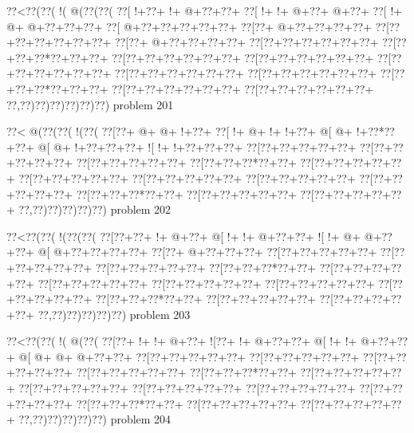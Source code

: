 \vbox{\vbox{\goo
\0??<\0??(\0??(\- !(\- @(\0??(\0??(
\0??[\- !+\0??+\- !+\- @+\0??+\0??+
\0??[\- !+\- !+\- @+\0??+\- @+\0??+
\0??[\- !+\- @+\- @+\0??+\0??+\0??+
\0??[\- @+\0??+\0??+\0??+\0??+\0??+
\0??[\0??+\- @+\0??+\0??+\0??+\0??+
\0??[\0??+\0??+\0??+\0??+\0??+\0??+
\0??[\0??+\- @+\0??+\0??+\0??+\0??+
\0??[\0??+\0??+\0??+\0??+\0??+\0??+
\0??[\0??+\0??+\0??*\0??+\0??+\0??+
\0??[\0??+\0??+\0??+\0??+\0??+\0??+
\0??[\0??+\0??+\0??+\0??+\0??+\0??+
\0??[\0??+\0??+\0??+\0??+\0??+\0??+
\0??[\0??+\0??+\0??+\0??+\0??+\0??+
\0??[\0??+\0??+\0??+\0??+\0??+\0??+
\0??[\0??+\0??+\0??*\0??+\0??+\0??+
\0??[\0??+\0??+\0??+\0??+\0??+\0??+
\0??[\0??+\0??+\0??+\0??+\0??+\0??+
\0??,\0??)\0??)\0??)\0??)\0??)\0??)
}
\hfil problem 201\hfil\break
}

\vbox{\vbox{\goo
\0??<\- @(\0??(\0??(\- !(\0??(
\0??[\0??+\- @+\- @+\- !+\0??+
\0??[\- !+\- @+\- !+\- !+\0??+
\- @[\- @+\- !+\0??*\0??+\0??+
\- @[\- @+\- !+\0??+\0??+\0??+
\- ![\- !+\- !+\0??+\0??+\0??+
\0??[\0??+\0??+\0??+\0??+\0??+
\0??[\0??+\0??+\0??+\0??+\0??+
\0??[\0??+\0??+\0??+\0??+\0??+
\0??[\0??+\0??+\0??*\0??+\0??+
\0??[\0??+\0??+\0??+\0??+\0??+
\0??[\0??+\0??+\0??+\0??+\0??+
\0??[\0??+\0??+\0??+\0??+\0??+
\0??[\0??+\0??+\0??+\0??+\0??+
\0??[\0??+\0??+\0??+\0??+\0??+
\0??[\0??+\0??+\0??*\0??+\0??+
\0??[\0??+\0??+\0??+\0??+\0??+
\0??[\0??+\0??+\0??+\0??+\0??+
\0??,\0??)\0??)\0??)\0??)\0??)
}
\hfil problem 202\hfil\break
}

\vbox{\vbox{\goo
\0??<\0??(\0??(\- !(\0??(\0??(
\0??[\0??+\0??+\- !+\- @+\0??+
\- @[\- !+\- !+\- @+\0??+\0??+
\- ![\- !+\- @+\- @+\0??+\0??+
\- @[\- @+\0??+\0??+\0??+\0??+
\0??[\0??+\- @+\0??+\0??+\0??+
\0??[\0??+\0??+\0??+\0??+\0??+
\0??[\0??+\0??+\0??+\0??+\0??+
\0??[\0??+\0??+\0??+\0??+\0??+
\0??[\0??+\0??+\0??*\0??+\0??+
\0??[\0??+\0??+\0??+\0??+\0??+
\0??[\0??+\0??+\0??+\0??+\0??+
\0??[\0??+\0??+\0??+\0??+\0??+
\0??[\0??+\0??+\0??+\0??+\0??+
\0??[\0??+\0??+\0??+\0??+\0??+
\0??[\0??+\0??+\0??*\0??+\0??+
\0??[\0??+\0??+\0??+\0??+\0??+
\0??[\0??+\0??+\0??+\0??+\0??+
\0??,\0??)\0??)\0??)\0??)\0??)
}
\hfil problem 203\hfil\break
}

\vbox{\vbox{\goo
\0??<\0??(\0??(\- !(\- @(\0??(
\0??[\0??+\- !+\- !+\- @+\0??+
\- ![\0??+\- !+\- @+\0??+\0??+
\- @[\- !+\- !+\- @+\0??+\0??+
\- @[\- @+\- @+\- @+\0??+\0??+
\0??[\0??+\0??+\0??+\0??+\0??+
\0??[\0??+\0??+\0??+\0??+\0??+
\0??[\0??+\0??+\0??+\0??+\0??+
\0??[\0??+\0??+\0??+\0??+\0??+
\0??[\0??+\0??+\0??*\0??+\0??+
\0??[\0??+\0??+\0??+\0??+\0??+
\0??[\0??+\0??+\0??+\0??+\0??+
\0??[\0??+\0??+\0??+\0??+\0??+
\0??[\0??+\0??+\0??+\0??+\0??+
\0??[\0??+\0??+\0??+\0??+\0??+
\0??[\0??+\0??+\0??*\0??+\0??+
\0??[\0??+\0??+\0??+\0??+\0??+
\0??[\0??+\0??+\0??+\0??+\0??+
\0??,\0??)\0??)\0??)\0??)\0??)
}
\hfil problem 204\hfil\break
}

